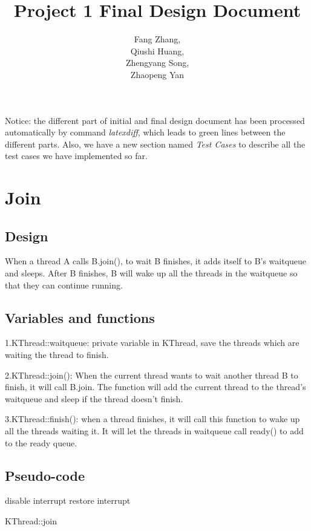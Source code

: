 \documentclass[a4paper,10pt]{article}
\title{Project 1 Final Design Document}
\author{Fang Zhang,\\
Qiushi Huang,\\
Zhengyang Song,\\
Zhaopeng Yan
}
\begin{document}
\maketitle

Notice: the different part of initial and final design document has been processed automatically by command \emph{latexdiff}, which leads to green lines between the different parts. Also, we have a new section named \emph{Test Cases} to describe all the test cases we have implemented so far.

\section{Join}

\subsection{Design}

When a thread A calls B.join(), to wait B finishes, it adds itself to B's waitqueue and sleeps. After B finishes, B will wake up all the threads in the waitqueue so that they can continue running.

\subsection{Variables and functions}

1.KThread::waitqueue: private variable in KThread, save the threads which are waiting the thread to finish.

2.KThread::join(): When the current thread wants to wait another thread B to finish, it will call B.join. The function will add the current thread to the thread's waitqueue and sleep if the thread doesn't finish.

3.KThread::finish(): when a thread finishes, it will call this function to wake up all the threads waiting it. It will let the threads in waitqueue call ready() to add to the ready queue.

\subsection{Pseudo-code}

\begin{algorithm}
\DontPrintSemicolon %
disable interrupt\;
restore interrupt\;
\caption{KThread::join}
\label{algo:change}
\end{algorithm}
\end{document}
